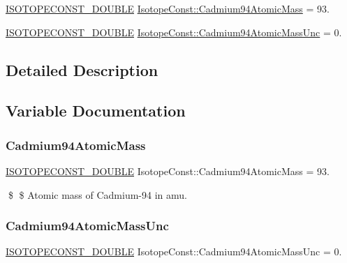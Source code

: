 \begin{DoxyCompactItemize}
\item 
\mbox{\hyperlink{group___isotope_const-_macros_ga8f45a7272ce02c0b4c65c44636ed719a}{I\+S\+O\+T\+O\+P\+E\+C\+O\+N\+S\+T\+\_\+\+D\+O\+U\+B\+LE}} \mbox{\hyperlink{group___isotope_const-_cadmium-_cd94_ga2e2489fdc093ebe51acba0c9c62a04c9}{Isotope\+Const\+::\+Cadmium94\+Atomic\+Mass}} = 93.
\item 
\mbox{\hyperlink{group___isotope_const-_macros_ga8f45a7272ce02c0b4c65c44636ed719a}{I\+S\+O\+T\+O\+P\+E\+C\+O\+N\+S\+T\+\_\+\+D\+O\+U\+B\+LE}} \mbox{\hyperlink{group___isotope_const-_cadmium-_cd94_gaa2294f858418b88a91c14ce8db9123b6}{Isotope\+Const\+::\+Cadmium94\+Atomic\+Mass\+Unc}} = 0.
\end{DoxyCompactItemize}


\subsection{Detailed Description}


\subsection{Variable Documentation}
\mbox{\label{group___isotope_const-_cadmium-_cd94_ga2e2489fdc093ebe51acba0c9c62a04c9}} 
\subsubsection{\texorpdfstring{Cadmium94\+Atomic\+Mass}{Cadmium94AtomicMass}}
{\footnotesize\ttfamily \mbox{\hyperlink{group___isotope_const-_macros_ga8f45a7272ce02c0b4c65c44636ed719a}{I\+S\+O\+T\+O\+P\+E\+C\+O\+N\+S\+T\+\_\+\+D\+O\+U\+B\+LE}} Isotope\+Const\+::\+Cadmium94\+Atomic\+Mass = 93.}

\$ \$ Atomic mass of Cadmium-\/94 in amu. \mbox{\label{group___isotope_const-_cadmium-_cd94_gaa2294f858418b88a91c14ce8db9123b6}} 
\subsubsection{\texorpdfstring{Cadmium94\+Atomic\+Mass\+Unc}{Cadmium94AtomicMassUnc}}
{\footnotesize\ttfamily \mbox{\hyperlink{group___isotope_const-_macros_ga8f45a7272ce02c0b4c65c44636ed719a}{I\+S\+O\+T\+O\+P\+E\+C\+O\+N\+S\+T\+\_\+\+D\+O\+U\+B\+LE}} Isotope\+Const\+::\+Cadmium94\+Atomic\+Mass\+Unc = 0.}

